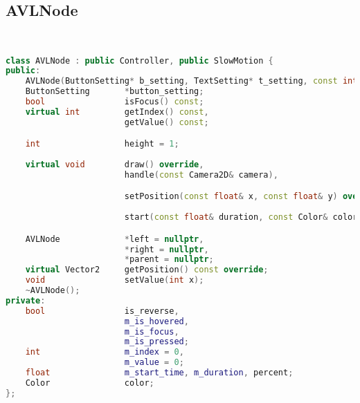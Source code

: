 \subsection{AVLNode}
\begin{lstlisting}[language=C++]


class AVLNode : public Controller, public SlowMotion {
public:
    AVLNode(ButtonSetting* b_setting, TextSetting* t_setting, const int& index, const int& val);
    ButtonSetting       *button_setting;
    bool                isFocus() const;
    virtual int         getIndex() const,
                        getValue() const;

    int                 height = 1;
                        
    virtual void        draw() override,
                        handle(const Camera2D& camera),

                        setPosition(const float& x, const float& y) override,
                        
                        start(const float& duration, const Color& color),

    AVLNode             *left = nullptr,
                        *right = nullptr,
                        *parent = nullptr;
    virtual Vector2     getPosition() const override;
    void                setValue(int x);
    ~AVLNode();
private:
    bool                is_reverse,
                        m_is_hovered,
                        m_is_focus,
                        m_is_pressed;
    int                 m_index = 0,
                        m_value = 0;
    float               m_start_time, m_duration, percent;
    Color               color;
};






\end{lstlisting}
